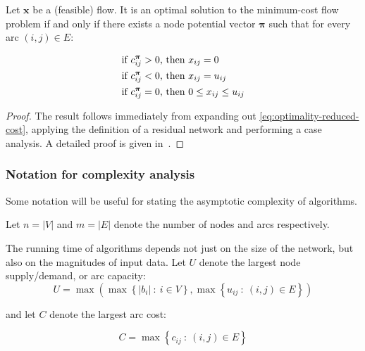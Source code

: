 \begin{thm} \label{thm:optimality-complementary-slackness}
Let $\mathbf{x}$ be a (feasible) flow. It is an optimal solution to the minimum-cost flow problem if and only if there exists a node potential vector $\boldsymbol{\pi}$ such that for every arc $(i,j)\in E$:

\normalfont %
\begin{align}
\text{if \ensuremath{c_{ij}^{\boldsymbol{\pi}}>0}, } & \text{then \ensuremath{x_{ij}=0}} \\
\text{if \ensuremath{c_{ij}^{\boldsymbol{\pi}}<0}, } & \text{then \ensuremath{x_{ij}=u_{ij}}} \\
\text{if \ensuremath{c_{ij}^{\boldsymbol{\pi}}=0}, } & \text{then \ensuremath{0\leq x_{ij}\leq  u_{ij}}}
\end{align}
\end{thm}
\begin{proof}
The result follows immediately from expanding out \cref{eq:optimality-reduced-cost}, applying the definition of a residual network and performing a case analysis. A detailed proof is given in~\cite[p.~310]{Ahuja:1993}.
\end{proof}

\subsubsection{Notation for complexity analysis} \label{sec:prep-flow-complexity}


Some notation will be useful for stating the asymptotic complexity of algorithms. 

Let $n=|V|$ and $m=|E|$ denote the number of nodes and arcs respectively.

The running time of algorithms depends not just on the size of the
network, but also on the magnitudes of input data. Let $U$ denote
the largest node supply/demand, or arc capacity:
\begin{equation}
U=\max\left(\max\left\{ |b_{i}|\::\: i\in V\right\} ,\max\left\{ u_{ij}\::\:\left(i,j\right)\in E\right\} \right)
\end{equation}

and let $C$ denote the largest arc cost:

\begin{equation}
C=\max\left\{ c_{ij}\::\:(i,j)\in E\right\} 
\end{equation}

